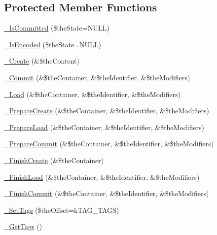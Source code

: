 \subsection*{Protected Member Functions}
\begin{DoxyCompactItemize}
\item 
\hyperlink{class_c_persistent_object_a6520a7bcecf3f39fd61ec6d08f736e77}{\-\_\-\-Is\-Committed} (\$the\-State=N\-U\-L\-L)
\item 
\hyperlink{class_c_persistent_object_aa8dc7db66e2af3d28c2035161a2aabf9}{\-\_\-\-Is\-Encoded} (\$the\-State=N\-U\-L\-L)
\item 
\hyperlink{class_c_persistent_object_a584005d1ec0d7e7327dc6d267a9ec50c}{\-\_\-\-Create} (\&\$the\-Content)
\item 
\hyperlink{class_c_persistent_object_ad5376e5aeda7a58e5b27fae6c03b4ef9}{\-\_\-\-Commit} (\&\$the\-Container, \&\$the\-Identifier, \&\$the\-Modifiers)
\item 
\hyperlink{class_c_persistent_object_ada4dfe5bdb0309dee9df94f6e96dc3cb}{\-\_\-\-Load} (\&\$the\-Container, \&\$the\-Identifier, \&\$the\-Modifiers)
\item 
\hyperlink{class_c_persistent_object_a2e5dd4f8a92c0ada964ade712c9579b0}{\-\_\-\-Prepare\-Create} (\&\$the\-Container, \&\$the\-Identifier, \&\$the\-Modifiers)
\item 
\hyperlink{class_c_persistent_object_a5a664513b015919da582c6f0230fab75}{\-\_\-\-Prepare\-Load} (\&\$the\-Container, \&\$the\-Identifier, \&\$the\-Modifiers)
\item 
\hyperlink{class_c_persistent_object_a9d98503112f78729b13995a850b174a8}{\-\_\-\-Prepare\-Commit} (\&\$the\-Container, \&\$the\-Identifier, \&\$the\-Modifiers)
\item 
\hyperlink{class_c_persistent_object_a9029ba173e65e2ec14eeb8bc7c2024c6}{\-\_\-\-Finish\-Create} (\&\$the\-Container)
\item 
\hyperlink{class_c_persistent_object_a35ffbe4e875e03a84985493bbce75457}{\-\_\-\-Finish\-Load} (\&\$the\-Container, \&\$the\-Identifier, \&\$the\-Modifiers)
\item 
\hyperlink{class_c_persistent_object_a535a2f078b777a144d31117de054ccf7}{\-\_\-\-Finish\-Commit} (\&\$the\-Container, \&\$the\-Identifier, \&\$the\-Modifiers)
\item 
\hyperlink{class_c_persistent_object_a948ba9d69729dfe20564aecdb9d4fae7}{\-\_\-\-Set\-Tags} (\$the\-Offset=k\-T\-A\-G\-\_\-\-T\-A\-G\-S)
\item 
\hyperlink{class_c_persistent_object_a7a9363dc8aba31cf00e382172ba327bd}{\-\_\-\-Get\-Tags} ()
\end{DoxyCompactItemize}
